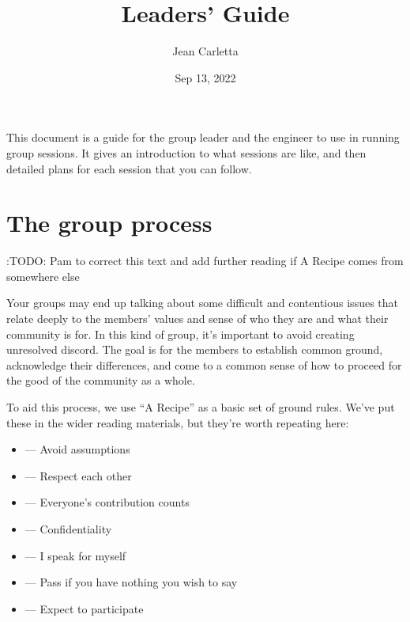 \documentclass[letterpaper,10pt,english]{jupyterBook}
\title{Leaders' Guide}
\date{Sep 13, 2022}
\author{Jean Carletta}
\begin{document}
\pagestyle{empty}
\sphinxmaketitle
\pagestyle{plain}
\sphinxtableofcontents
\pagestyle{normal}
\label{\detokenize{intro::doc}}


\sphinxAtStartPar
This document is a guide for the group leader and the engineer to use in running group sessions.  It gives an introduction to what sessions are like, and then detailed plans for each session that you can follow.

\sphinxstepscope


\chapter{The group process}
\label{\detokenize{group-process:the-group-process}}\label{\detokenize{group-process::doc}}
\sphinxAtStartPar
:TODO: Pam to correct this text and add further reading if A Recipe comes from somewhere else

\sphinxAtStartPar
Your groups may end up talking about some difficult and contentious issues that relate deeply to the members’ values and sense of who they are and what their community is for.  In this kind of group, it’s important to avoid creating unresolved discord.  The goal is for the members to establish common ground, acknowledge their differences,  and come to a common sense of how to proceed for the good of the community as a whole.

\sphinxAtStartPar
To aid this process, we use “A Recipe” as a basic set of ground rules. We’ve put these in the wider reading materials, but they’re worth repeating here:
\begin{itemize}
\item {} 
\sphinxAtStartPar
{} — Avoid assumptions

\item {} 
\sphinxAtStartPar
{} — Respect each other

\item {} 
\sphinxAtStartPar
{} — Everyone’s contribution counts

\item {} 
\sphinxAtStartPar
{} — Confidentiality

\item {} 
\sphinxAtStartPar
{} — I speak for myself

\item {} 
\sphinxAtStartPar
{} — Pass if you have nothing you wish to say

\item {} 
\sphinxAtStartPar
{} — Expect to participate

\end{itemize}
\end{document}
